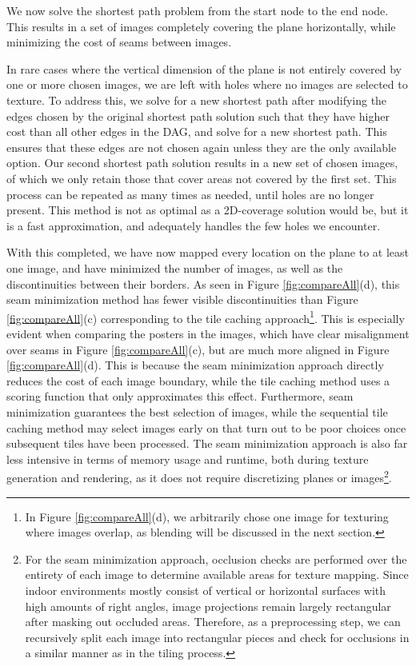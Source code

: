 \documentclass[]{spie}  %
\begin{document}
We now solve the shortest path problem from the start node to the end
node. This results in a set of images completely covering the plane
horizontally, while minimizing the cost of seams between images.

In rare cases where the vertical dimension of the plane is not
entirely covered by one or more chosen images, we are left with holes
where no images are selected to texture. To address this, we solve for
a new shortest path after modifying the edges chosen by the original
shortest path solution such that they have higher cost than all other
edges in the DAG, and solve for a new shortest path. This ensures that
these edges are not chosen again unless they are the only available
option. Our second shortest path solution results in a new set of
chosen images, of which we only retain those that cover areas not
covered by the first set. This process can be repeated as many times
as needed, until holes are no longer present. This method is not as
optimal as a 2D-coverage solution would be, but it is a fast
approximation, and adequately handles the few holes we encounter.

With this completed, we have now mapped every location on the plane to
at least one image, and have minimized the number of images, as well
as the discontinuities between their borders. As seen in Figure
\ref{fig:compareAll}(d), this seam minimization method has fewer
visible discontinuities than Figure \ref{fig:compareAll}(c)
corresponding to the tile caching approach\footnote{In Figure
  \ref{fig:compareAll}(d), we arbitrarily chose one image for
  texturing where images overlap, as blending will be discussed in the
  next section.}. This is especially evident when comparing the
posters in the images, which have clear misalignment over seams in
Figure \ref{fig:compareAll}(c), but are much more aligned in Figure
\ref{fig:compareAll}(d). This is because the seam minimization
approach directly reduces the cost of each image boundary, while the
tile caching method uses a scoring function that only approximates
this effect. Furthermore, seam minimization guarantees the best
selection of images, while the sequential tile caching method may
select images early on that turn out to be poor choices once
subsequent tiles have been processed. The seam minimization approach
is also far less intensive in terms of memory usage and runtime, both
during texture generation and rendering, as it does not require
discretizing planes or images\footnote {For the seam minimization
  approach, occlusion checks are performed over the entirety of each
  image to determine available areas for texture mapping. Since indoor
  environments mostly consist of vertical or horizontal surfaces with
  high amounts of right angles, image projections remain largely
  rectangular after masking out occluded areas. Therefore, as a
  preprocessing step, we can recursively split each image into
  rectangular pieces and check for occlusions in a similar manner as
  in the tiling process.  }.
\end{document}
